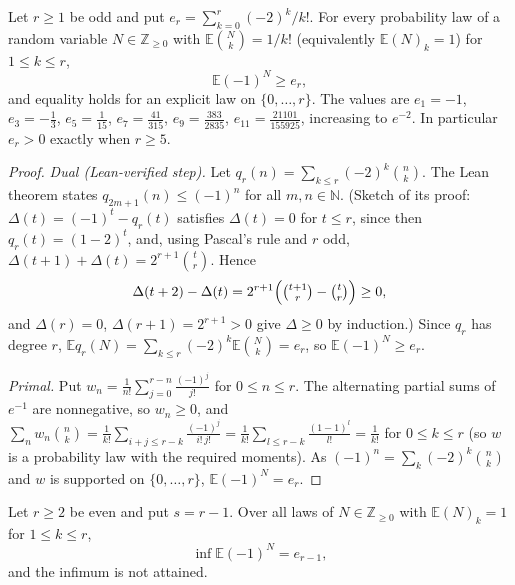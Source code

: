 \documentclass[11pt]{article}
\newcommand{\Ex}{\mathbb E}
\begin{document}
\begin{theorem}\label{thm:parity}
Let $r\ge1$ be odd and put $e_r=\sum_{k=0}^r(-2)^k/k!$. For every probability law of a random variable $N\in\mathbb Z_{\ge0}$ with $\Ex\binom Nk=1/k!$ (equivalently $\Ex(N)_k=1$) for $1\le k\le r$,
\[
\Ex(-1)^N\ge e_r,
\]
and equality holds for an explicit law on $\{0,\dots,r\}$. The values are $e_1=-1$, $e_3=-\tfrac13$, $e_5=\tfrac1{15}$, $e_7=\tfrac{41}{315}$, $e_9=\tfrac{383}{2835}$, $e_{11}=\tfrac{21101}{155925}$, increasing to $e^{-2}$. In particular $e_r>0$ exactly when $r\ge5$.
\end{theorem}

\begin{proof}
\emph{Dual (Lean-verified step).} Let $q_r(n)=\sum_{k\le r}(-2)^k\binom nk$. The Lean theorem
states $q_{2m+1}(n)\le(-1)^n$ for all $m,n\in\mathbb N$. (Sketch of its proof: $\Delta(t)=(-1)^t-q_r(t)$ satisfies $\Delta(t)=0$ for $t\le r$, since then $q_r(t)=(1-2)^t$, and, using Pascal's rule and $r$ odd, $\Delta(t+1)+\Delta(t)=2^{r+1}\binom tr$. Hence
\[
\Delta(t+2)-\Delta(t)=2^{r+1}\Bigl(\tbinom{t+1}r-\tbinom tr\Bigr)\ge0,
\]
and $\Delta(r)=0$, $\Delta(r+1)=2^{r+1}>0$ give $\Delta\ge0$ by induction.) Since $q_r$ has degree $r$, $\Ex q_r(N)=\sum_{k\le r}(-2)^k\Ex\binom Nk=e_r$, so $\Ex(-1)^N\ge e_r$.

\emph{Primal.} Put $w_n=\frac1{n!}\sum_{j=0}^{r-n}\frac{(-1)^j}{j!}$ for $0\le n\le r$. The alternating partial sums of $e^{-1}$ are nonnegative, so $w_n\ge0$, and
$\sum_nw_n\binom nk=\frac1{k!}\sum_{i+j\le r-k}\frac{(-1)^j}{i!\,j!}=\frac1{k!}\sum_{l\le r-k}\frac{(1-1)^l}{l!}=\frac1{k!}$ for $0\le k\le r$ (so $w$ is a probability law with the required moments). As $(-1)^n=\sum_k(-2)^k\binom nk$ and $w$ is supported on $\{0,\dots,r\}$, $\Ex(-1)^N=e_r$.
\end{proof}

\begin{proposition}\label{prop:even}
Let $r\ge2$ be even and put $s=r-1$. Over all laws of $N\in\mathbb Z_{\ge0}$ with $\Ex(N)_k=1$ for $1\le k\le r$,
\[
\inf\Ex(-1)^N=e_{r-1},
\]
and the infimum is not attained.
\end{proposition}
\end{document}
